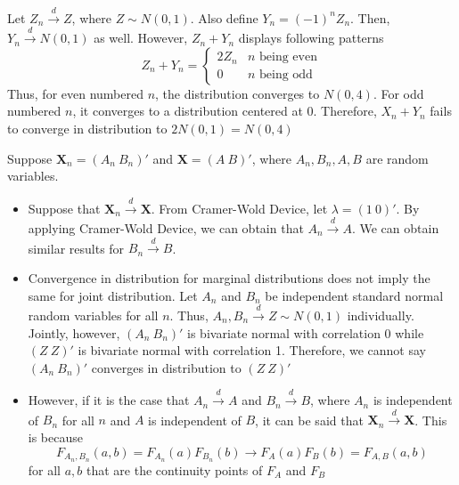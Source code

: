 \begin{mdframed}[backgroundcolor=yellow!5] 

\begin{example}
Let $Z_n\xrightarrow{d}Z$, where $Z\sim N(0,1)$. Also define $Y_n = (-1)^nZ_n$. Then, $Y_n\xrightarrow{d} N(0,1)$ as well. However, $Z_n+Y_n$ displays following patterns
\small{\[
Z_n+Y_n = \begin{cases} 2Z_n & n\text{ being even} \\ 0& n\text{ being odd}\end{cases}
\]}\normalsize
Thus, for even numbered $n$, the distribution converges to $N(0,4)$. For odd numbered $n$, it converges to a distribution centered at 0. Therefore, $X_n+Y_n$ fails to converge in distribution to $2N(0,1)=N(0,4)$
\end{example}
\begin{example}
Suppose $\mathbf{X}_n=( A_n\  B_n)'$ and $\mathbf{X}=( A\ B)'$, where $A_n, B_n, A, B$ are random variables. 
\begin{itemize}
\item Suppose that $\mathbf{X}_n\xrightarrow{d} \mathbf{X}$.  From Cramer-Wold Device, let $\lambda=(1 \ 0)'$. By applying Cramer-Wold Device, we can obtain that $A_n\xrightarrow{d}A$. We can obtain similar results for $B_n\xrightarrow{d}B$. 
\item Convergence in distribution for marginal distributions does not imply the same for joint distribution. Let $A_n$ and $B_n$ be independent standard normal random variables for all $n$. Thus, $A_n,B_n\xrightarrow{d}Z\sim N(0,1)$ individually. Jointly, however, $(A_n \ B_n)'$ is bivariate normal with correlation 0 while $(Z \ Z)'$ is bivariate normal with correlation 1. Therefore, we cannot say $(A_n \ B_n)'$ converges in distribution to $(Z \ Z)'$
\item However, if it is the case that $A_n\xrightarrow{d}A$ and $B_n\xrightarrow{d}B$, where $A_n$ is independent of $B_n$ for all $n$ and $A$ is independent of $B$, it can be said that $\mathbf{X}_n\xrightarrow{d}\mathbf{X}$. This is because
\small{\[
F_{A_n,B_n}(a,b)=F_{A_n}(a)F_{B_n}(b)\to F_A(a)F_B(b)=F_{A,B}(a,b)
\]}\normalsize for all $a,b$ that are the continuity points of $F_A$ and $F_B$
\end{itemize}
\end{example}
\end{mdframed}\par


